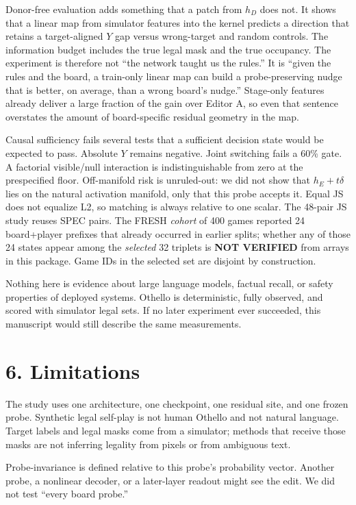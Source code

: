 \documentclass[11pt]{article}
\begin{document}
Donor-free evaluation adds something that a patch from \(h_D\) does not. It shows that a linear map from simulator features into the kernel predicts a direction that retains a target-aligned \(Y\) gap versus wrong-target and random controls. The information budget includes the true legal mask and the true occupancy. The experiment is therefore not ``the network taught us the rules.'' It is ``given the rules and the board, a train-only linear map can build a probe-preserving nudge that is better, on average, than a wrong board's nudge.'' Stage-only features already deliver a large fraction of the gain over Editor A, so even that sentence overstates the amount of board-specific residual geometry in the map.

Causal sufficiency fails several tests that a sufficient decision state would be expected to pass. Absolute \(Y\) remains negative. Joint switching fails a 60\% gate. A factorial visible/null interaction is indistinguishable from zero at the prespecified floor. Off-manifold risk is unruled-out: we did not show that \(h_E+t\delta\) lies on the natural activation manifold, only that this probe accepts it. Equal JS does not equalize L2, so matching is always relative to one scalar. The 48-pair JS study reuses SPEC pairs. The FRESH \emph{cohort} of 400 games reported 24 board+player prefixes that already occurred in earlier splits; whether any of those 24 states appear among the \emph{selected} 32 triplets is \textbf{NOT VERIFIED} from arrays in this package. Game IDs in the selected set are disjoint by construction.

Nothing here is evidence about large language models, factual recall, or safety properties of deployed systems. Othello is deterministic, fully observed, and scored with simulator legal sets. If no later experiment ever succeeded, this manuscript would still describe the same measurements.

\section{6. Limitations}

The study uses one architecture, one checkpoint, one residual site, and one frozen probe. Synthetic legal self-play is not human Othello and not natural language. Target labels and legal masks come from a simulator; methods that receive those masks are not inferring legality from pixels or from ambiguous text.

Probe-invariance is defined relative to this probe's probability vector. Another probe, a nonlinear decoder, or a later-layer readout might see the edit. We did not test ``every board probe.''
\end{document}

